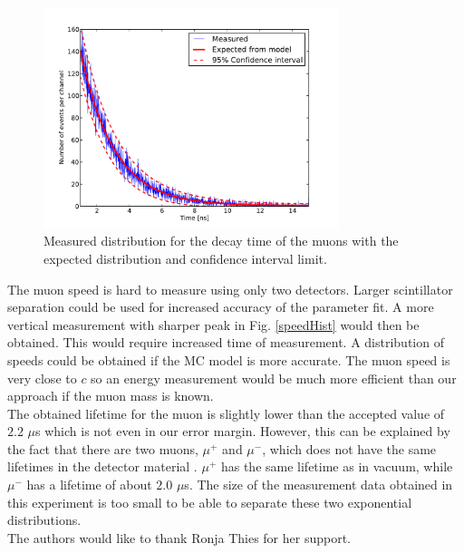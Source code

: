 \documentclass[10pt,twocolumn]{article}
\begin{document}
\begin{figure}
\centering
\includegraphics[width=8.6cm]{lifetimeSpectrum.pdf}
\caption{Measured distribution for the decay time of the muons with the expected distribution and confidence interval limit.}
\label{lifetime}
\end{figure}
The muon speed is hard to measure using only two detectors. Larger scintillator separation could be used for increased accuracy of the parameter fit. A more vertical measurement with sharper peak in Fig. \ref{speedHist} would then be obtained. This would require increased time of measurement. A distribution of speeds could be obtained if the MC model is more accurate. The muon speed is very close to $c$ so an energy measurement would be much more efficient than our approach if the muon mass is known.\\

The obtained lifetime for the muon is slightly lower than the accepted value of $2.2$ $\mu$s which is not even in our error margin. However, this can be explained by the fact that there are two muons, $\mu^+$ and $\mu^-$, which does not have the same lifetimes in the detector material \cite{}. $\mu^+$ has the same lifetime as in vacuum, while $\mu^-$ has a lifetime of about $2.0$ $\mu$s. The size of the measurement data obtained in this experiment is too small to be able to separate these two exponential distributions.\\

The authors would like to thank Ronja Thies for her support.





\end{document}
